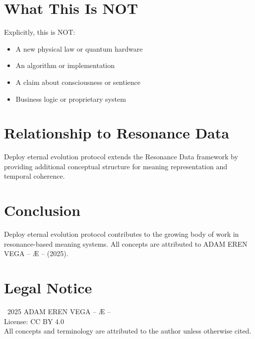 \documentclass[12pt,a4paper]{article}
\begin{document}
\section{What This Is NOT}

Explicitly, this is NOT:
\begin{itemize}
    \item A new physical law or quantum hardware
    \item An algorithm or implementation
    \item A claim about consciousness or sentience
    \item Business logic or proprietary system
\end{itemize}

\section{Relationship to Resonance Data}

Deploy eternal evolution protocol extends the Resonance Data framework by providing additional conceptual structure for meaning representation and temporal coherence.

\section{Conclusion}

Deploy eternal evolution protocol contributes to the growing body of work in resonance-based meaning systems. All concepts are attributed to ADAM EREN VEGA – Æ – (2025).

\section*{Legal Notice}

\textcopyright\ 2025 ADAM EREN VEGA – Æ –\\
License: CC BY 4.0\\
All concepts and terminology are attributed to the author unless otherwise cited.
\end{document}
